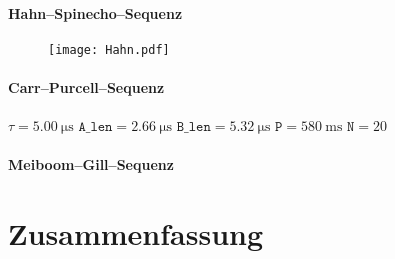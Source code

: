 \FloatBarrier
\subsubsection{Hahn–Spinecho–Sequenz}

\begin{figure}[htbp]
    \centering
    \texttt{[image: Hahn.pdf]}
    \caption{%
    }
    \label{fig:}
\end{figure}

\FloatBarrier
\subsubsection{Carr–Purcell–Sequenz}

$\tau = \SI{5.00}{\micro\second}$
$\texttt{A\_len} = \SI{2.66}{\micro\second}$
$\texttt{B\_len} = \SI{5.32}{\micro\second}$
$\texttt{P} = \SI{580}{\milli\second}$
$\texttt{N} = \num{20}$

\FloatBarrier
\subsubsection{Meiboom–Gill–Sequenz}


\FloatBarrier
\chapter{Zusammenfassung}

\fehlt


